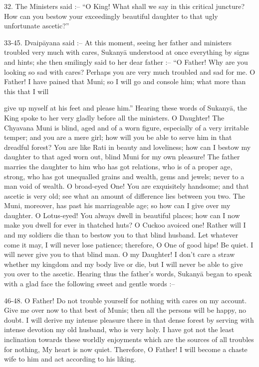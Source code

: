 32. The Ministers said :-- ``O King! What shall we say in this critical juncture? How can you bestow your exceedingly beautiful daughter to that ugly unfortunate ascetic?''

33-45. Dvaip\=ayana said :-- At this moment, seeing her father and ministers troubled very much with cares, Sukany\=a understood at once everything by signs and hints; she then smilingly said to her dear father :-- ``O Father! Why are you looking so sad with cares? Perhaps you are very much troubled and sad for me. O Father! I have pained that Muni; so I will go and console him; what more than this that I will

give up myself at his feet and please him.'' Hearing these words of Sukany\=a, the King spoke to her very gladly before all the ministers. O Daughter! The Chyavana Muni is blind, aged and of a worn figure, especially of a very irritable temper; and you are a mere girl; how will you be able to serve him in that dreadful forest? You are like Rati in beauty and loveliness; how can I bestow my daughter to that aged worn out, blind Muni for my own pleasure! The father marries the daughter to him who has got relations, who is of a proper age, strong, who has got unequalled grains and wealth, gems and jewels; never to a man void of wealth. O broad-eyed One! You are exquisitely handsome; and that ascetic is very old; see what an amount of difference lies between you two. The Muni, moreover, has past his marriageable age; so how can I give over my daughter. O Lotus-eyed! You always dwell in beautiful places; how can I now make you dwell for ever in thatched huts? O Cuckoo avoiced one! Rather will I and my soldiers die than to bestow you to that blind husband. Let whatever come it may, I will never lose patience; therefore, O One of good hips! Be quiet. I will never give you to that blind man. O my Daughter! I don't care a straw whether my kingdom and my body live or die, but I will never be able to give you over to the ascetic. Hearing thus the father's words, Sukany\=a began to speak with a glad face the following sweet and gentle words :--

46-48. O Father! Do not trouble yourself for nothing with cares on my account. Give me over now to that best of Munis; then all the persons will be happy, no doubt. I will derive my intense pleasure there in that dense forest by serving with intense devotion my old husband, who is very holy. I have got not the least inclination towards these worldly enjoyments which are the sources of all troubles for nothing, My heart is now quiet. Therefore, O Father! I will become a chaste wife to him and act according to his liking.

